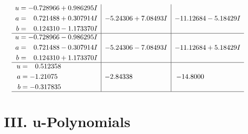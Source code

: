 \documentclass[1p]{elsarticle_modified}
\theoremstyle{definition}
\begin{document}
$$\begin{array}{c|c|c}
\begin{aligned}
u &= -0.728966 + 0.986295 I \\
a &= \phantom{-}0.721488 + 0.307914 I \\
b &= \phantom{-}0.124310 - 1.173370 I\end{aligned}
 & -5.24306 + 7.08493 I & -11.12684 - 5.18429 I \\ \hline\begin{aligned}
u &= -0.728966 - 0.986295 I \\
a &= \phantom{-}0.721488 - 0.307914 I \\
b &= \phantom{-}0.124310 + 1.173370 I\end{aligned}
 & -5.24306 - 7.08493 I & -11.12684 + 5.18429 I \\ \hline\begin{aligned}
u &= \phantom{-}0.512358\phantom{ +0.000000I} \\
a &= -1.21075\phantom{ +0.000000I} \\
b &= -0.317835\phantom{ +0.000000I}\end{aligned}
 & -2.84338\phantom{ +0.000000I} & -14.8000\phantom{ +0.000000I}\\
 \hline 
 \end{array}$$\newpage
\newpage\renewcommand{\arraystretch}{1}
\centering \section*{ III. u-Polynomials}
\end{document}
